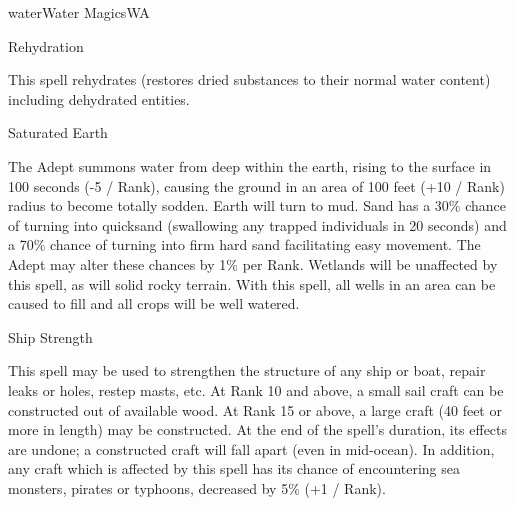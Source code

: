 \begin{college}[1.3]{water}{Water Magics}{WA}
\begin{spell}[G-6]{Rehydration}

\begin{effects}
This spell rehydrates (restores dried substances to their normal water
content) including dehydrated entities.
\end{effects}
\end{spell}


\begin{spell}[G-7]{Saturated Earth}

\begin{effects}
The Adept summons water from deep within the earth, rising to the
surface in 100 seconds (-5 / Rank), causing the ground in an area of
100 feet (+10 / Rank) radius to become totally sodden. Earth will turn
to mud. Sand has a 30\% chance of turning into quicksand (swallowing
any trapped individuals in 20 seconds) and a 70\% chance of turning
into firm hard sand facilitating easy movement. The Adept may alter
these chances by 1\% per Rank. Wetlands will be unaffected by this
spell, as will solid rocky terrain. With this spell, all wells in an
area can be caused to fill and all crops will be well watered.
\end{effects}
\end{spell}


\begin{spell}[G-8]{Ship Strength}

\begin{effects}
This spell may be used to strengthen the structure of any ship or
boat, repair leaks or holes, restep masts, etc. At Rank 10 and above,
a small sail craft can be constructed out of available wood. At Rank
15 or above, a large craft (40 feet or more in length) may be
constructed. At the end of the spell's duration, its effects are
undone; a constructed craft will fall apart (even in mid-ocean). In
addition, any craft which is affected by this spell has its chance of
encountering sea monsters, pirates or typhoons, decreased by 5\%
(+1 / Rank).
\end{effects}
\end{spell}



\end{college}
